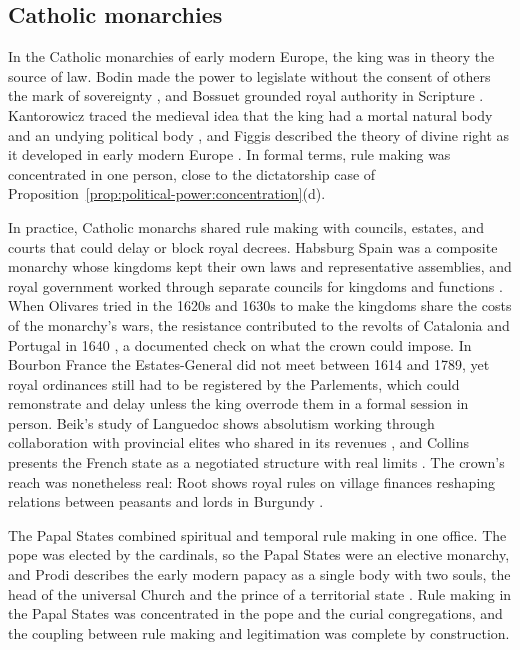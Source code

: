 \documentclass[11pt,letterpaper]{article}
\theoremstyle{definition}
\theoremstyle{remark}
\begin{document}
\subsection{Catholic monarchies}

In the Catholic monarchies of early modern Europe, the king was in theory the source of law. Bodin made the power to legislate without the consent of others the mark of sovereignty \citep{bodin1992}, and Bossuet grounded royal authority in Scripture \citep{bossuet1990}. Kantorowicz traced the medieval idea that the king had a mortal natural body and an undying political body \citep{kantorowicz1957}, and Figgis described the theory of divine right as it developed in early modern Europe \citep{figgis1914}. In formal terms, rule making was concentrated in one person, close to the dictatorship case of Proposition~\ref{prop:political-power:concentration}(d).

In practice, Catholic monarchs shared rule making with councils, estates, and courts that could delay or block royal decrees. Habsburg Spain was a composite monarchy whose kingdoms kept their own laws and representative assemblies, and royal government worked through separate councils for kingdoms and functions \citep{elliott1963}. When Olivares tried in the 1620s and 1630s to make the kingdoms share the costs of the monarchy's wars, the resistance contributed to the revolts of Catalonia and Portugal in 1640 \citep{elliott1963,elliott1984}, a documented check on what the crown could impose. In Bourbon France the Estates-General did not meet between 1614 and 1789, yet royal ordinances still had to be registered by the Parlements, which could remonstrate and delay unless the king overrode them in a formal session in person. Beik's study of Languedoc shows absolutism working through collaboration with provincial elites who shared in its revenues \citep{beik1985}, and Collins presents the French state as a negotiated structure with real limits \citep{collins1995}. The crown's reach was nonetheless real: Root shows royal rules on village finances reshaping relations between peasants and lords in Burgundy \citep{root1987}.

The Papal States combined spiritual and temporal rule making in one office. The pope was elected by the cardinals, so the Papal States were an elective monarchy, and Prodi describes the early modern papacy as a single body with two souls, the head of the universal Church and the prince of a territorial state \citep{prodi1987}. Rule making in the Papal States was concentrated in the pope and the curial congregations, and the coupling between rule making and legitimation was complete by construction.
\end{document}
